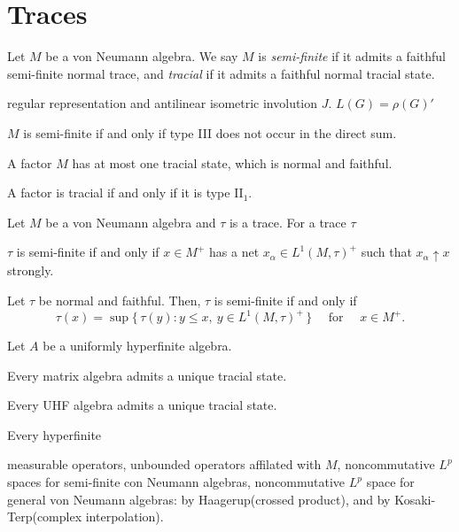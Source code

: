 \documentclass{../../large}
\begin{document}
\section{Traces}

\begin{prb}
Let $M$ be a von Neumann algebra.
We say $M$ is \emph{semi-finite} if it admits a faithful semi-finite normal trace, and \emph{tracial} if it admits a faithful normal tracial state.
\begin{parts}
\item regular representation and antilinear isometric involution $J$. $L(G)=\rho(G)'$
\item $M$ is semi-finite if and only if type III does not occur in the direct sum.

\item A factor $M$ has at most one tracial state, which is normal and faithful.
\item A factor is tracial if and only if it is type II$_1$.
\end{parts}
\end{prb}


\begin{prb}
Let $M$ be a von Neumann algebra and $\tau$ is a trace.
For a trace $\tau$
\begin{parts}
\item $\tau$ is semi-finite if and only if $x\in M^+$ has a net $x_\alpha\in L^1(M,\tau)^+$ such that $x_\alpha\uparrow x$ strongly.
\item Let $\tau$ be normal and faithful. Then, $\tau$ is semi-finite if and only if
\[\tau(x)=\sup\{\,\tau(y):y\le x,\ y\in L^1(M,\tau)^+\,\}\quad\text{ for }\quad x\in M^+.\]
\end{parts}
\end{prb}

\begin{prb}
Let $A$ be a uniformly hyperfinite algebra.
\begin{parts}
\item Every matrix algebra admits a unique tracial state.
\item Every UHF algebra admits a unique tracial state.
\item Every hyperfinite 
\end{parts}
\end{prb}


measurable operators,
unbounded operators affilated with $M$,
noncommutative $L^p$ spaces for semi-finite con Neumann algebras,
noncommutative $L^p$ space for general von Neumann algebras: by Haagerup(crossed product), and by Kosaki-Terp(complex interpolation).
\end{document}
